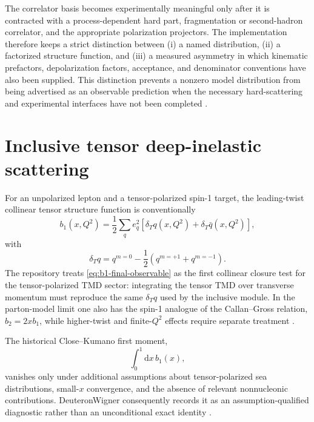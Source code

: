 \documentclass[11pt,oneside]{book}
\newcommand{\dd}{\mathrm{d}}
\begin{document}
The correlator basis becomes experimentally meaningful only after it is contracted with a process-dependent hard part, fragmentation or second-hadron correlator, and the appropriate polarization projectors.  The implementation therefore keeps a strict distinction between (i) a named distribution, (ii) a factorized structure function, and (iii) a measured asymmetry in which kinematic prefactors, depolarization factors, acceptance, and denominator conventions have also been supplied.  This distinction prevents a nonzero model distribution from being advertised as an observable prediction when the necessary hard-scattering and experimental interfaces have not been completed \cite{BacchettaEtAl2007SIDIS,Collins2011,DWProductionBoundary2026}.

\section{Inclusive tensor deep-inelastic scattering}

For an unpolarized lepton and a tensor-polarized spin-1 target, the leading-twist collinear tensor structure function is conventionally
\begin{equation}
 b_1(x,Q^2)
 =\frac12\sum_q e_q^2
 \left[\delta_T q(x,Q^2)+\delta_T\bar q(x,Q^2)\right],
 \label{eq:b1-final-observable}
\end{equation}
with
\begin{equation}
 \delta_T q
 =q^{m=0}-\frac12\left(q^{m=+1}+q^{m=-1}\right).
 \label{eq:deltaT-final-observable}
\end{equation}
The repository treats \cref{eq:b1-final-observable} as the first collinear closure test for the tensor-polarized TMD sector: integrating the tensor TMD over transverse momentum must reproduce the same $\delta_T q$ used by the inclusive module.  In the parton-model limit one also has the spin-1 analogue of the Callan--Gross relation, $b_2=2x b_1$, while higher-twist and finite-$Q^2$ effects require separate treatment \cite{HoodbhoyJaffeManohar1989,HERMES2005b1,CosynDongKumanoSargsian2017}.

The historical Close--Kumano first moment,
\begin{equation}
 \int_0^1 \dd x\,b_1(x),
 \label{eq:b1-moment}
\end{equation}
vanishes only under additional assumptions about tensor-polarized sea distributions, small-$x$ convergence, and the absence of relevant nonnucleonic contributions.  DeuteronWigner consequently records it as an assumption-qualified diagnostic rather than an unconditional exact identity \cite{HoodbhoyJaffeManohar1989,JaffeManohar1989,Miller2014b1}.
\end{document}
